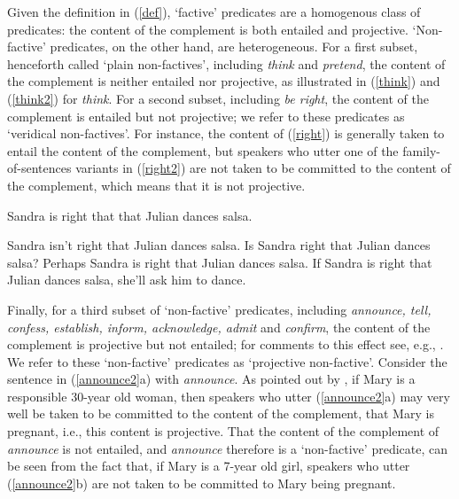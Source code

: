 \documentclass[11pt,fleqn]{article}
\newcommand{\6}{\mbox{$[\hspace*{-.6mm}[$}}
\newcommand{\9}{\mbox{$]\hspace*{-.6mm}]$}}
\begin{document}
Given the definition in (\ref{def}), `factive' predicates are a homogenous class of predicates: the content of the complement is both entailed and projective. `Non-factive' predicates, on the other hand, are heterogeneous. For a first subset, henceforth called `plain non-factives', including {\em think} and {\em pretend}, the content of the complement is neither entailed nor projective, as illustrated in (\ref{think}) and (\ref{think2}) for {\em think}. For a second subset, including {\em be right}, the content of the complement is entailed but not projective; we refer to these predicates as `veridical non-factives'. For instance, the content of (\ref{right}) is generally taken to entail the content of the complement, but speakers who utter one of the family-of-sentences variants in (\ref{right2}) are not taken to be committed to the content of the complement, which means that it is not projective. 

\begin{exe}
\ex\label{right} Sandra is right that that Julian dances salsa.
\ex\label{right2} 

\begin{xlist} 
\ex Sandra isn't right that Julian dances salsa. 
\ex Is Sandra right that Julian dances salsa?
\ex Perhaps Sandra is right that Julian dances salsa.
\ex If Sandra is right that Julian dances salsa, she'll ask him to dance. 
\end{xlist}
\end{exe}
Finally, for a third subset of `non-factive' predicates, including {\em announce, tell, confess, establish, inform, acknowledge, admit} and {\em confirm}, the content of the complement is projective but not entailed; for comments to this effect see, e.g., \citealt{reis1973,melvold1991,schultz2003,swanson2012,anand-hacquard2014,spector-egre2015,karttunen2016,tbd-variability}.  We refer to these `non-factive' predicates as `projective non-factive'. Consider the sentence in (\ref{announce2}a) with {\em announce}. As pointed out by \citet[139]{schlenker10}, if Mary is a responsible 30-year old woman, then speakers who utter (\ref{announce2}a) may very well be taken to be committed to the content of the complement, that Mary is pregnant, i.e., this content is projective. That the content of the complement of {\em announce} is not entailed, and {\em announce} therefore is a `non-factive' predicate, can be seen from the fact that, if Mary is a 7-year old girl, speakers who utter (\ref{announce2}b)  are not taken to be committed to Mary being pregnant. 
\end{document}
